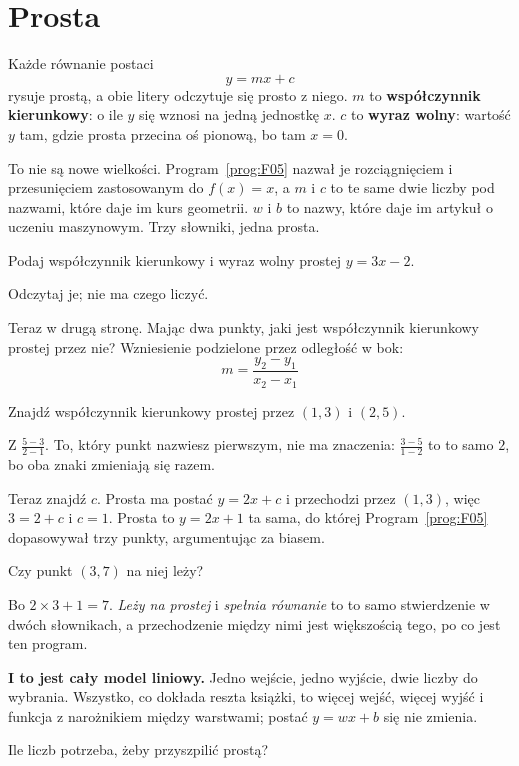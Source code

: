 \section{Prosta}
\label{sec:F06-line}

\begin{fr}
Każde równanie postaci
\[ y = mx + c \]
rysuje prostą, a obie litery odczytuje się prosto z niego. $m$ to
\textbf{współczynnik kierunkowy}: o ile $y$ się wznosi na jedną jednostkę $x$.
$c$ to \textbf{wyraz wolny}: wartość $y$ tam, gdzie prosta przecina oś
pionową, bo tam $x = 0$.

To nie są nowe wielkości. Program~\ref{prog:F05} nazwał je rozciągnięciem i
przesunięciem zastosowanym do $f(x) = x$, a $m$ i $c$ to te same dwie liczby
pod nazwami, które daje im kurs geometrii. $w$ i $b$ to nazwy, które daje im
artykuł o uczeniu maszynowym. Trzy słowniki, jedna prosta.

Podaj współczynnik kierunkowy i wyraz wolny prostej $y = 3x - 2$.
\nextframe
\end{fr}

\begin{fr}
Odczytaj je; nie ma czego liczyć.

Teraz w drugą stronę. Mając dwa punkty, jaki jest współczynnik kierunkowy
prostej przez nie? Wzniesienie podzielone przez odległość w bok:
\[ m = \frac{y_2 - y_1}{x_2 - x_1} \]

Znajdź współczynnik kierunkowy prostej przez $(1, 3)$ i $(2, 5)$.
\nextframe
\end{fr}

\begin{fr}
Z $\frac{5 - 3}{2 - 1}$. To, który punkt nazwiesz pierwszym, nie ma znaczenia:
$\frac{3 - 5}{1 - 2}$ to to samo $2$, bo oba znaki zmieniają się razem.

Teraz znajdź $c$. Prosta ma postać $y = 2x + c$ i przechodzi przez $(1, 3)$,
więc $3 = 2 + c$ i $c = 1$. Prosta to $y = 2x + 1$ \dash{} ta sama, do której
Program~\ref{prog:F05} dopasowywał trzy punkty, argumentując za biasem.

Czy punkt $(3, 7)$ na niej leży?
\nextframe
\end{fr}

\begin{fr}
Bo $2 \times 3 + 1 = 7$. \emph{Leży na prostej} i \emph{spełnia równanie} to
to samo stwierdzenie w dwóch słownikach, a przechodzenie między nimi jest
większością tego, po co jest ten program.

\textbf{I to jest cały model liniowy.} Jedno wejście, jedno wyjście, dwie
liczby do wybrania. Wszystko, co dokłada reszta książki, to więcej wejść,
więcej wyjść i funkcja z narożnikiem między warstwami; postać $y = wx + b$ się
nie zmienia.

Ile liczb potrzeba, żeby przyszpilić prostą?
\nextframe
\end{fr}

